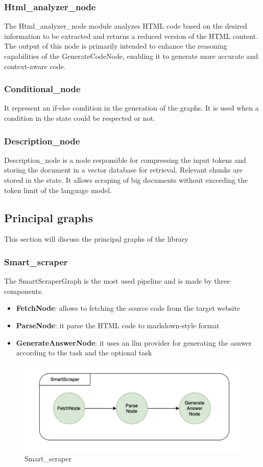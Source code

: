 \subsubsection{Html\_analyzer\_node}
The Html\_analyzer\_node module analyzes HTML code based on the desired information to be extracted and returns a reduced version of the HTML content. The output of this node is primarily intended to enhance the reasoning capabilities of the GenerateCodeNode, enabling it to generate more accurate and context-aware code.

\subsubsection{Conditional\_node}
It represent an if-else condition in the generation of the graphs. It is used when a condition in the state could be respected or not.

\subsubsection{Description\_node}
Description\_node is a node responsible for compressing the input tokens and storing the document in a vector database for retrieval. Relevant chunks are stored in the state. It allows scraping of big documents without exceeding the token limit of the language model.

\subsection{Principal graphs}

This section will discuss the principal graphs of the library
\subsubsection{Smart\_scraper}
The SmartScraperGraph is the most used pipeline and is made by three components.
\begin{itemize}
    \item \textbf{FetchNode}: allows to fetching the source code from the target website
    \item \textbf{ParseNode}: it parse the HTML code to markdown-style format
    \item \textbf{GenerateAnswerNode}: it uses an llm provider for generating the asnwer according to the task and the optional task
\end{itemize}
\begin{figure}[h!]
    \centering
    \includegraphics[width=0.75\linewidth]{Assets/smart_scraper.png}
    \caption{Smart\_scraper}
    \label{fig:smart_scraper}
\end{figure}

